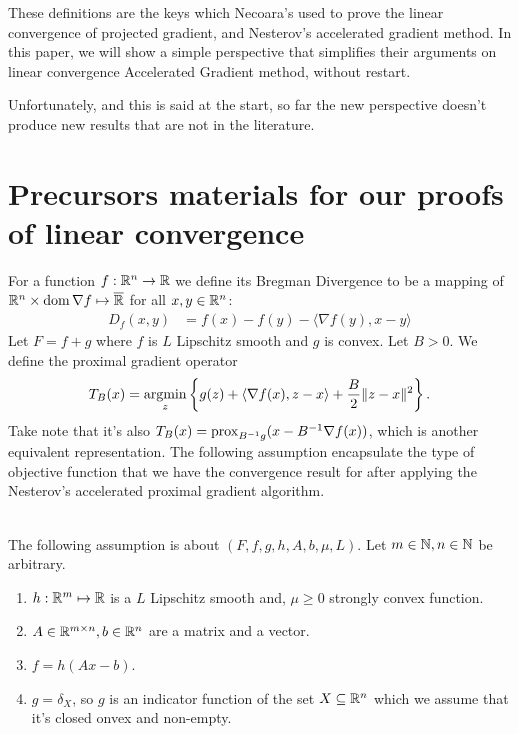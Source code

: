 \documentclass[12pt]{article}
\begin{document}
    These definitions are the keys which Necoara's used to prove the linear convergence of projected gradient, and Nesterov's accelerated gradient method. 
    In this paper, we will show a simple perspective that simplifies their arguments on linear convergence Accelerated Gradient method, without restart. 
    \par
    Unfortunately, and this is said at the start, so far the new perspective doesn't produce new results that are not in the literature. 

\section{Precursors materials for our proofs of linear convergence}
    For a function $f: \mathbb R^n \rightarrow \mathbb R$ we define its Bregman Divergence to be a mapping of $\mathbb R^n \times \operatorname{dom}\nabla f\mapsto \overline {\mathbb R}$ for all $x, y \in \mathbb R^n$: 
    \begin{align*}
        D_f(x, y) &= 
        f(x) - f(y) - \langle \nabla f(y), x - y\rangle 
    \end{align*}
    Let $F = f + g$ where $f$ is $L$ Lipschitz smooth and $g$ is convex.
    Let $B > 0$. 
    We define the proximal gradient operator 
    \begin{align*}
        T_{B}(x) = \mathop{\rm argmin}\limits_{z}\left\lbrace
            g(z) + \langle \nabla f(x), z - x\rangle + \frac{B}{2}\Vert z - x\Vert^2
        \right\rbrace. 
    \end{align*}
    Take note that it's also $T_B(x) = \operatorname{prox}_{B^{-1}g}(x - B^{-1}\nabla f(x))$, which is another equivalent representation. 
    The following assumption encapsulate the type of objective function that we have the convergence result for after applying the Nesterov's accelerated proximal gradient algorithm. 
    \begin{assumption}\;\label{ass:obj-fxn}\\
        The following assumption is about $(F, f, g, h, A, b, \mu, L)$. 
        Let $m \in \mathbb N, n \in \mathbb N$ be arbitrary. 
        \begin{enumerate}[nosep]
            \item $h: \mathbb R^m \mapsto \mathbb R$ is a $L$ Lipschitz smooth and, $\mu \ge 0$ strongly convex function. 
            \item $A \in \mathbb R^{m \times n}, b \in \mathbb R^n$ are a matrix and a vector. 
            \item $f = h(Ax - b)$. 
            \item $g = \delta_{X}$, so $g$ is an indicator function of the set $X \subseteq \mathbb R^n$ which we assume that it's closed onvex and non-empty. 
        \end{enumerate}
    \end{assumption}
\end{document}
